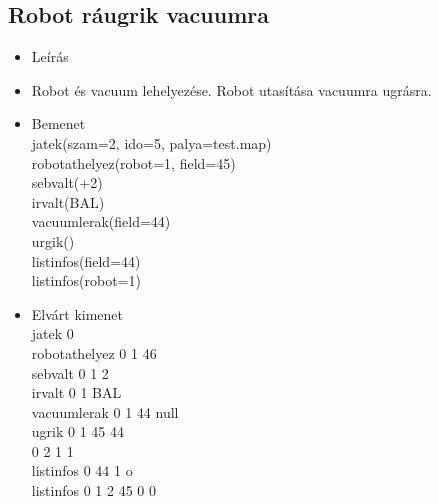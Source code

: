 \subsection{Robot ráugrik vacuumra}
\begin{itemize}
	\item Leírás\\
	\item Robot és vacuum lehelyezése. Robot utasítása vacuumra ugrásra.
	\item Bemenet\\
		jatek(szam=2, ido=5, palya=test.map) \\
		robotathelyez(robot=1, field=45) \\
		sebvalt(+2) \\
		irvalt(BAL) \\
		vacuumlerak(field=44) \\
		urgik() \\
		listinfos(field=44) \\
		listinfos(robot=1) \\
	\item Elvárt kimenet\\
		jatek 0 \\
		robotathelyez 0 1 46 \\
		sebvalt 0 1 2 \\
		irvalt 0 1 BAL \\		
		vacuumlerak 0 1 44 null\\
		ugrik 0 1 45 44 \\
	   		  0 2 1 1 \\		
		listinfos 0 44 1 o\\
		listinfos 0 1 2 45 0 0 \\
\end{itemize}

